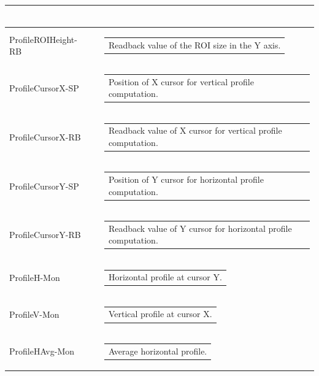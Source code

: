 \documentclass[openany]{article}
\begin{document}
\begin{longtable}{| m{3.0cm} m{4.5cm} m{7.0cm} |}
\begin{tabular}{@{}m{6cm}@{}}
            \end{tabular} \\ \hline
        ProfileROIHeight-RB &  & \begin{tabular}{@{}m{6cm}@{}}
                Readback value of the ROI size in the Y axis.
            \end{tabular} \hypertarget{}{}\\ \hline
        ProfileCursorX-SP &  & \begin{tabular}{@{}m{6cm}@{}}
                Position of X cursor for vertical profile computation.
            \end{tabular} \\ \hline
        ProfileCursorX-RB &  & \begin{tabular}{@{}m{6cm}@{}}
                Readback value of X cursor for vertical profile computation.
            \end{tabular} \hypertarget{}{}\\ \hline
        ProfileCursorY-SP &  & \begin{tabular}{@{}m{6cm}@{}}
                Position of Y cursor for horizontal profile computation.
            \end{tabular} \\ \hline
        ProfileCursorY-RB &  & \begin{tabular}{@{}m{6cm}@{}}
                Readback value of Y cursor for horizontal profile computation.
            \end{tabular} \hypertarget{}{}\\ \hline
        ProfileH-Mon &  & \begin{tabular}{@{}m{6cm}@{}}
                Horizontal profile at cursor Y.
            \end{tabular} \hypertarget{}{}\\ \hline
        ProfileV-Mon &  & \begin{tabular}{@{}m{6cm}@{}}
                Vertical profile at cursor X.
            \end{tabular} \hypertarget{}{}\\ \hline
        ProfileHAvg-Mon &  & \begin{tabular}{@{}m{6cm}@{}}
                Average horizontal profile.
            \end{tabular} \hypertarget{}{}\\ \hline

\end{longtable}
\end{document}
